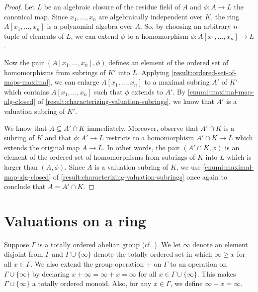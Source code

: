\begin{proof}
Let $L$ be an algebraic closure of the residue field of $A$ and $\phi : A \to L$ the canonical map. Since $x_1, \dotsc, x_n$ are algebraically independent over $K$, the ring $A[x_1, \dotsc, x_n]$ is a polynomial algebra over $A$. So, by choosing an arbitrary $n$-tuple of elements of $L$, we can extend $\phi$ to a homomorphism $\phi : A[x_1, \dotsc, x_n] \to L$. 

Now the pair $(A[x_1, \dotsc, x_n], \phi)$ defines an element of the ordered set of homomorphisms from subrings of $K'$ into $L$. Applying \cref{result:ordered-set-of-maps-maximal}, we can enlarge $A[x_1, \dotsc, x_n]$ to a maximal subring $A'$ of $K'$ which contains $A[x_1, \dotsc, x_n]$ such that $\phi$ extends to $A'$. By \cref{enumi:maximal-map-alg-closed} of \cref{result:characterizing-valuation-subrings}, we know that $A'$ is a valuation subring of $K'$. 

We know that $A \subseteq A' \cap K$ immediately. Moreover, observe that $A' \cap K$ is a subring of $K$ and that $\phi : A' \to L$ restricts to a homomorphism $A' \cap K \to L$ which extends the original map $A \to L$. In other words, the pair $(A' \cap K, \phi)$ is an element of the ordered set of homomorphisms from subrings of $K$ into $L$ which is larger than $(A, \phi)$. Since $A$ is a valuation subring of $K$, we use \cref{enumi:maximal-map-alg-closed} of \cref{result:characterizing-valuation-subrings} once again to conclude that $A = A' \cap K$. 
\end{proof}

\section{Valuations on a ring}

\begin{definition}
Suppose $\Gamma$ is a totally ordered abelian group (cf. ). We let $\infty$ denote an element disjoint from $\Gamma$ and $\Gamma \cup \{\infty\}$ denote the totally ordered set in which $\infty \geq x$ for all $x \in \Gamma$. We also extend the group operation $+$ on $\Gamma$ to an operation on $\Gamma \cup \{\infty\}$ by declaring $x + \infty = \infty + x = \infty$ for all $x \in \Gamma \cup \{\infty\}$. This makes $\Gamma \cup \{\infty\}$ a totally ordered monoid. Also, for any $x \in \Gamma$, we define $\infty - x = \infty$. 
\end{definition}

